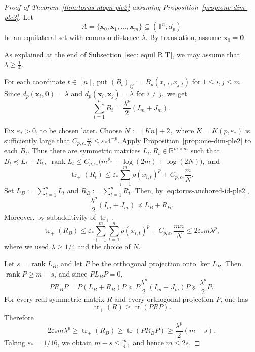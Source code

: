 \documentclass[11pt]{article}
\theoremstyle{definition}
\newcommand{\T}{\mathbb T}
\newcommand{\R}{\mathbb R}
\begin{document}
\begin{proof}[Proof of Theorem~\ref{thm:torus-nlogn-ple2} assuming Proposition~\ref{prop:one-dim-ple2}]
Let
\[
A=\{\boldsymbol{x}_0,\boldsymbol{x}_1,\dots,\boldsymbol{x}_m\}
\subseteq(\T^n,d_p)
\]
be an equilateral set with common distance \(\lambda\). By translation, assume
\(\boldsymbol{x}_0=\boldsymbol{0}\).

As explained at the end of Subsection~\ref{sec: equil R T},
we may
assume that
\(
\lambda\ge \frac14.
\)

For each coordinate \(t\in[n]\), put
\(
(B_t)_{ij}:=B_p(x_{i,t},x_{j,t})\) for \(1\le i,j\le m.
\)
Since
\(
d_p(\boldsymbol{x}_i,\boldsymbol{0})=\lambda\) and
\(
d_p(\boldsymbol{x}_i,\boldsymbol{x}_j)=\lambda\) for \(i\neq j,\)
we get
\begin{equation}\label{eq:torus-anchored-id-ple2}
\sum_{t=1}^n B_t
=
\frac{\lambda^p}{2}(I_m+J_m).
\end{equation}

Fix \(\varepsilon_*>0\), to be chosen later. Choose
\(
N:=\lceil K n\rceil+2,
\)
where \(K=K(p,\varepsilon_*)\) is sufficiently large that
\(
C_{p,\varepsilon_*}\frac{n}{N}\le \varepsilon_*4^{-p}.
\)
Apply Proposition~\ref{prop:one-dim-ple2} to each \(B_t\). Thus there are
symmetric matrices \(L_t,R_t\in\R^{m\times m}\) such that
\(
B_t\preceq L_t+R_t,
\)
\(
\operatorname{rank}L_t
\le
C_{p,\varepsilon_*}\bigl(m^{\vartheta_p}+\log(2m)+\log(2N)\bigr),
\)
and
\[
\operatorname{tr}_+(R_t)
\le
\varepsilon_*\sum_{i=1}^m \rho(x_{i,t})^p
+
C_{p,\varepsilon_*}\frac{m}{N}.
\]
Set
\(
L_B:=\sum_{t=1}^n L_t\) and
\(
R_B:=\sum_{t=1}^n R_t.
\)
Then, by \eqref{eq:torus-anchored-id-ple2},
\[
\frac{\lambda^p}{2}(I_m+J_m)\preceq L_B+R_B.
\]
Moreover, by subadditivity of \(\operatorname{tr}_+\),
\[
\operatorname{tr}_+(R_B)
\le
\varepsilon_*
\sum_{i=1}^m\sum_{t=1}^n \rho(x_{i,t})^p
+
C_{p,\varepsilon_*}\frac{mn}{N}
\le
2\varepsilon_*m\lambda^p,
\]
where we used \(\lambda\ge1/4\) and the choice of \(N\).

Let \(s=\operatorname{rank}L_B\), and let \(P\) be the orthogonal projection onto
\(\ker L_B\). Then \(\operatorname{rank}P\ge m-s\), and since \(PL_BP=0\),
\[
PR_BP
=
P(L_B+R_B)P
\succeq
P\frac{\lambda^p}{2}(I_m+J_m)P
\succeq
\frac{\lambda^p}{2}P.
\]
For every real symmetric matrix \(R\) and every orthogonal projection \(P\), one has
\[
\operatorname{tr}_+(R)\ge \operatorname{tr}(PRP).
\]
Therefore
\[
2\varepsilon_*m\lambda^p
\ge
\operatorname{tr}_+(R_B)
\ge
\operatorname{tr}(PR_BP)
\ge
\frac{\lambda^p}{2}(m-s).
\]
Taking \(\varepsilon_*=1/16\), we obtain
\(
m-s\le \frac{m}{4},
\)
and hence
\(
m\le 2s.
\)


\end{proof}
\end{document}
